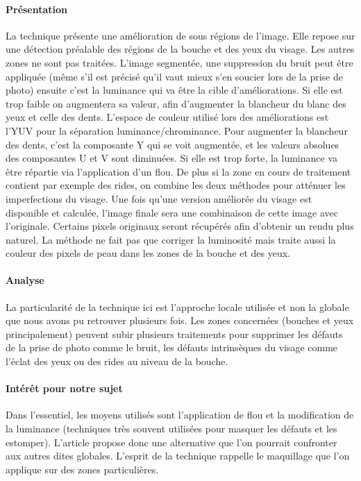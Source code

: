 \documentclass[11pt, french]{report-rd-info}
\begin{document}
\paragraph{Présentation}
La technique présente une amélioration de sous régions de l’image.  Elle repose sur une détection préalable des régions de la bouche et des yeux du visage. Les autres zones ne sont pas traitées.
L’image segmentée, une suppression du bruit peut être appliquée (même s’il est précisé qu’il vaut mieux s’en soucier lors de la prise de photo) ensuite c’est la luminance qui va être la cible d’améliorations. Si elle est trop faible on augmentera sa valeur, afin d’augmenter la blancheur du blanc des yeux et celle des dents. L’espace de couleur utilisé lors des améliorations est l’YUV pour la séparation luminance/chrominance. Pour augmenter la blancheur des dents, c’est la composante Y qui se voit augmentée, et les valeurs absolues des composantes U et V sont diminuées.
Si elle est trop forte, la luminance va être répartie via l’application d’un flou. De plus si la zone en cours de traitement contient par exemple des rides, on combine les deux méthodes pour atténuer les imperfections du visage.
Une fois qu’une version améliorée du visage est disponible et calculée, l’image finale sera une combinaison de cette image avec l’originale. Certains pixels originaux seront récupérés afin d’obtenir un rendu plus naturel.
La méthode ne fait pas que corriger la luminosité mais traite aussi la couleur des pixels de peau dans les zones de la bouche et des yeux.

\paragraph{Analyse}
La particularité de la technique ici est l’approche locale utilisée et non la globale que nous avons pu retrouver plusieurs fois. Les zones concernées (bouches et yeux principalement) peuvent subir plusieurs traitements pour supprimer les défauts de la prise de photo comme le bruit, les défauts intrinsèques du visage comme l’éclat des yeux ou des rides au niveau de la bouche. 

\paragraph{Intérêt pour notre sujet}
Dans l’essentiel, les moyens utilisés sont l’application de flou et la modification de la luminance (techniques très souvent utilisées pour masquer les défauts et les estomper). L’article propose donc une alternative que l’on pourrait confronter aux autres dites globales. L’esprit de la technique rappelle le maquillage que l’on applique sur des zones particulières.
\end{document}
